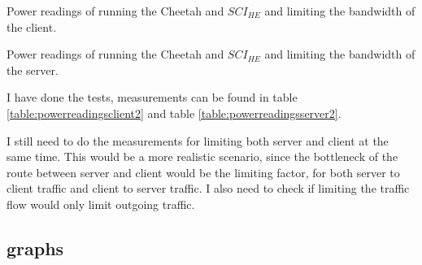 \documentclass[../thesis.tex]{subfiles}
\begin{document}
\begin{table}
        \begin{adjustbox}{width=\columnwidth,center}
                
        \end{adjustbox}
        \caption{Power readings of running the Cheetah and $SCI_{HE}$ and limiting the bandwidth of the client.}
        \label{table:powerreadingsclient2}
\end{table}

\begin{table}
        \begin{adjustbox}{width=\columnwidth,center}
                
        \end{adjustbox}
        \caption{Power readings of running the Cheetah and $SCI_{HE}$ and limiting the bandwidth of the server.}
        \label{table:powerreadingsserver2}
\end{table}
    

I have done the tests, measurements can be found in table \ref{table:powerreadingsclient2} and table \ref{table:powerreadingsserver2}.

\color{red}I still need to do the measurements for limiting both server and client at the same time. This would be a more realistic scenario, since the bottleneck of the route between server and client would be the limiting factor, for both server to client traffic and client to server traffic. I also need to check if limiting the traffic flow would only limit outgoing traffic.\color{black}


\subsection{graphs}
\end{document}
